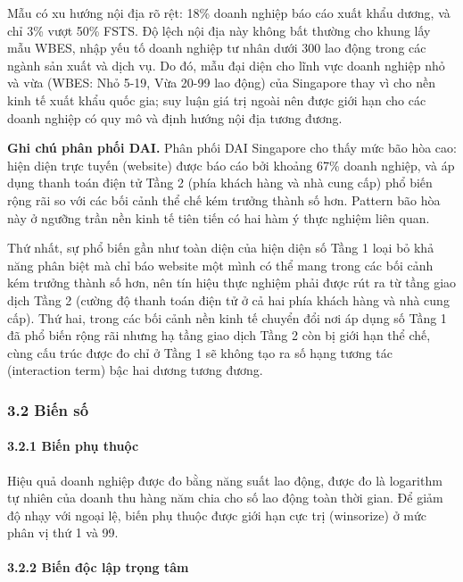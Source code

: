 \documentclass[12pt,a4paper]{article}
\begin{document}
Mẫu có xu hướng nội địa rõ rệt: 18\% doanh nghiệp báo cáo xuất khẩu
dương, và chỉ 3\% vượt 50\% FSTS. Độ lệch nội địa này không bất thường
cho khung lấy mẫu WBES, nhập yếu tố doanh nghiệp tư nhân dưới 300 lao
động trong các ngành sản xuất và dịch vụ. Do đó, mẫu đại diện cho lĩnh
vực doanh nghiệp nhỏ và vừa (WBES: Nhỏ 5-19, Vừa 20-99 lao động) của
Singapore thay vì cho nền kinh tế xuất khẩu quốc gia; suy luận giá trị
ngoài nên được giới hạn cho các doanh nghiệp có quy mô và định hướng nội
địa tương đương.

\textbf{Ghi chú phân phối DAI.} Phân phối DAI Singapore cho thấy mức bão
hòa cao: hiện diện trực tuyến (website) được báo cáo bởi khoảng 67\%
doanh nghiệp, và áp dụng thanh toán điện tử Tầng 2 (phía khách hàng và
nhà cung cấp) phổ biến rộng rãi so với các bối cảnh thể chế kém trưởng
thành số hơn. Pattern bão hòa này ở ngưỡng trần nền kinh tế tiên tiến có
hai hàm ý thực nghiệm liên quan.

Thứ nhất, sự phổ biến gần như toàn diện của hiện diện số Tầng 1 loại bỏ
khả năng phân biệt mà chỉ báo website một mình có thể mang trong các bối
cảnh kém trưởng thành số hơn, nên tín hiệu thực nghiệm phải được rút ra
từ tầng giao dịch Tầng 2 (cường độ thanh toán điện tử ở cả hai phía
khách hàng và nhà cung cấp). Thứ hai, trong các bối cảnh nền kinh tế
chuyển đổi nơi áp dụng số Tầng 1 đã phổ biến rộng rãi nhưng hạ tầng giao
dịch Tầng 2 còn bị giới hạn thể chế, cùng cấu trúc được đo chỉ ở Tầng 1
sẽ không tạo ra số hạng tương tác (interaction term) bậc hai dương tương
đương.

\hypertarget{32-biux1ebfn-sux1ed1}{%
\subsubsection{3.2 Biến số}\label{32-biux1ebfn-sux1ed1}}

\hypertarget{321-biux1ebfn-phux1ee5-thuux1ed9c}{%
\paragraph{3.2.1 Biến phụ
thuộc}\label{321-biux1ebfn-phux1ee5-thuux1ed9c}}

Hiệu quả doanh nghiệp được đo bằng năng suất lao động, được đo là
logarithm tự nhiên của doanh thu hàng năm chia cho số lao động toàn thời
gian. Để giảm độ nhạy với ngoại lệ, biến phụ thuộc được giới hạn cực trị
(winsorize) ở mức phân vị thứ 1 và 99.

\hypertarget{322-biux1ebfn-ux111ux1ed9c-lux1eadp-trux1ecdng-tuxe2m}{%
\paragraph{3.2.2 Biến độc lập trọng
tâm}\label{322-biux1ebfn-ux111ux1ed9c-lux1eadp-trux1ecdng-tuxe2m}}
\end{document}
